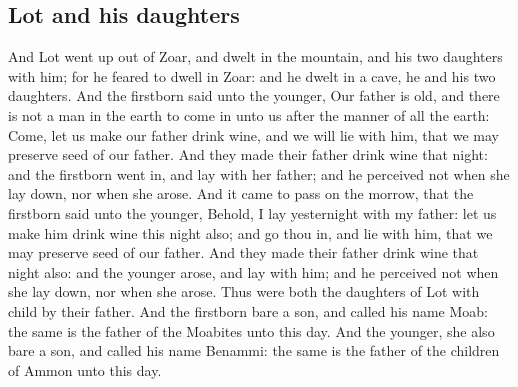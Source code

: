 \begin{biblechapter}
\section*{Lot and his daughters}
\verse And Lot went up out of Zoar, and dwelt in the mountain, and his two daughters with him; for he feared to dwell in Zoar: and he dwelt in a cave, he and his two daughters.
\verse And the firstborn said unto the younger, Our father is old, and there is not a man in the earth to come in unto us after the manner of all the earth:
\verse Come, let us make our father drink wine, and we will lie with him, that we may preserve seed of our father.
\verse And they made their father drink wine that night: and the firstborn went in, and lay with her father; and he perceived not when she lay down, nor when she arose.
\verse And it came to pass on the morrow, that the firstborn said unto the younger, Behold, I lay yesternight with my father: let us make him drink wine this night also; and go thou in, and lie with him, that we may preserve seed of our father.
\verse And they made their father drink wine that night also: and the younger arose, and lay with him; and he perceived not when she lay down, nor when she arose.
\verse Thus were both the daughters of Lot with child by their father.
\verse And the firstborn bare a son, and called his name Moab: the same is the father of the Moabites unto this day.
\verse And the younger, she also bare a son, and called his name Benammi: the same is the father of the children of Ammon unto this day.
\end{biblechapter}

